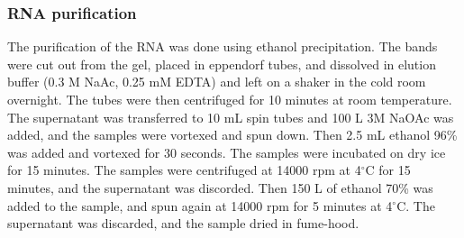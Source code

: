 


\subsubsection{RNA purification}

The purification of the RNA was done using ethanol precipitation. The bands were cut out from the gel, placed in eppendorf tubes, and dissolved in elution buffer (0.3 M NaAc, 0.25 mM EDTA) and left on a shaker in the cold room overnight. The tubes were then centrifuged for 10 minutes at room temperature. The supernatant was transferred to 10 mL spin tubes and 100 \si{\micro}L 3M NaOAc was added, and the samples were vortexed and spun down. Then 2.5 mL ethanol 96\% was added and vortexed for 30 seconds. The samples were incubated on dry ice for 15 minutes. The samples were centrifuged at 14000 rpm at 4$^\circ$C for 15 minutes, and the supernatant was discorded. Then 150 \si{\micro}L of ethanol 70\% was added to the sample, and spun again at 14000 rpm for 5 minutes at 4$^\circ$C. The supernatant was discarded, and the sample dried in fume-hood.

